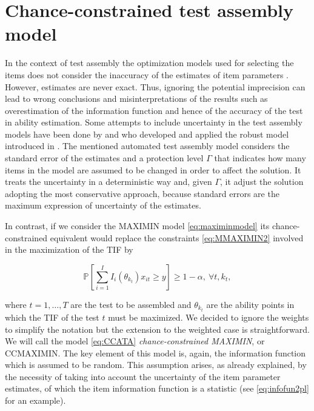 \section{Chance-constrained test assembly model}\label{sec:CCATA}

In the context of test assembly the optimization models used for selecting the items does not consider the inaccuracy of the estimates of item parameters \parencite{VDL2005}. However, estimates are never exact. Thus, ignoring the potential imprecision can lead to wrong conclusions and misinterpretations of the results such as overestimation of the information function and hence of the accuracy of the test in ability estimation. Some attempts to include uncertainty in the test assembly models have been done by \textcite{veldkamp2013application} and \textcite{veldkamp2013uncertainties} who developed and applied the robust model introduced in \textcite{bertsimas2003robust}. The mentioned automated test assembly model considers the standard error of the estimates and a protection level $\Gamma$ that indicates how many items in the model are assumed to be changed in order to affect the solution. It treats the uncertainty in a deterministic way and, given $\Gamma$, it adjust the solution adopting the most conservative approach, because standard errors are the maximum expression of uncertainty of the estimates.

In contrast, if we consider the MAXIMIN model \eqref{eq:maximinmodel} its chance-constrained equivalent would replace the constraints \eqref{eq:MMAXIMIN2} involved in the maximization of the TIF by 

\begin{equation}\label{eq:CCATA}
\mathbb{P}\left[\sum_{i=1}^I I_i(\theta_{k_t}) x_{it} \ge y \right] \geq 1-\alpha , \ \forall t,k_t,
\end{equation}

where $t=1,\ldots,T$ are the test to be assembled and $\theta_{k_t}$ are the ability points in which the TIF of the test $t$ must be maximized. We decided to ignore the weights to simplify the notation but the extension to the weighted case is straightforward. We will call the model \eqref{eq:CCATA} \emph{chance-constrained MAXIMIN}, or CCMAXIMIN. The key element of this model is, again, the information function which is assumed to be random. This assumption arises, as already explained, by the necessity of taking into account the uncertainty of the item parameter estimates, of which the item information function is a statistic (see \eqref{eq:infofun2pl} for an example).

